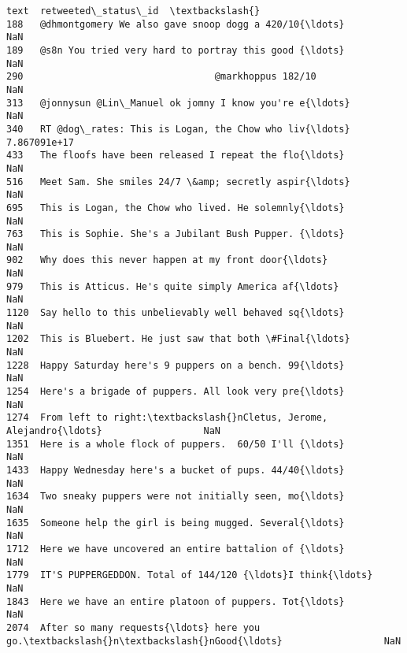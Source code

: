 \documentclass[11pt]{article}
\begin{document}
\begin{tcolorbox}[breakable, size=fbox, boxrule=.5pt, pad at break*=1mm, opacityfill=0]
\begin{Verbatim}[commandchars=\\\{\}]
                                                   text  retweeted\_status\_id  \textbackslash{}
188   @dhmontgomery We also gave snoop dogg a 420/10{\ldots}                  NaN
189   @s8n You tried very hard to portray this good {\ldots}                  NaN
290                                  @markhoppus 182/10                  NaN
313   @jonnysun @Lin\_Manuel ok jomny I know you're e{\ldots}                  NaN
340   RT @dog\_rates: This is Logan, the Chow who liv{\ldots}         7.867091e+17
433   The floofs have been released I repeat the flo{\ldots}                  NaN
516   Meet Sam. She smiles 24/7 \&amp; secretly aspir{\ldots}                  NaN
695   This is Logan, the Chow who lived. He solemnly{\ldots}                  NaN
763   This is Sophie. She's a Jubilant Bush Pupper. {\ldots}                  NaN
902   Why does this never happen at my front door{\ldots}                  NaN
979   This is Atticus. He's quite simply America af{\ldots}                  NaN
1120  Say hello to this unbelievably well behaved sq{\ldots}                  NaN
1202  This is Bluebert. He just saw that both \#Final{\ldots}                  NaN
1228  Happy Saturday here's 9 puppers on a bench. 99{\ldots}                  NaN
1254  Here's a brigade of puppers. All look very pre{\ldots}                  NaN
1274  From left to right:\textbackslash{}nCletus, Jerome, Alejandro{\ldots}                  NaN
1351  Here is a whole flock of puppers.  60/50 I'll {\ldots}                  NaN
1433  Happy Wednesday here's a bucket of pups. 44/40{\ldots}                  NaN
1634  Two sneaky puppers were not initially seen, mo{\ldots}                  NaN
1635  Someone help the girl is being mugged. Several{\ldots}                  NaN
1712  Here we have uncovered an entire battalion of {\ldots}                  NaN
1779  IT'S PUPPERGEDDON. Total of 144/120 {\ldots}I think{\ldots}                  NaN
1843  Here we have an entire platoon of puppers. Tot{\ldots}                  NaN
2074  After so many requests{\ldots} here you go.\textbackslash{}n\textbackslash{}nGood{\ldots}                  NaN


\end{Verbatim}
\end{tcolorbox}
\end{document}
